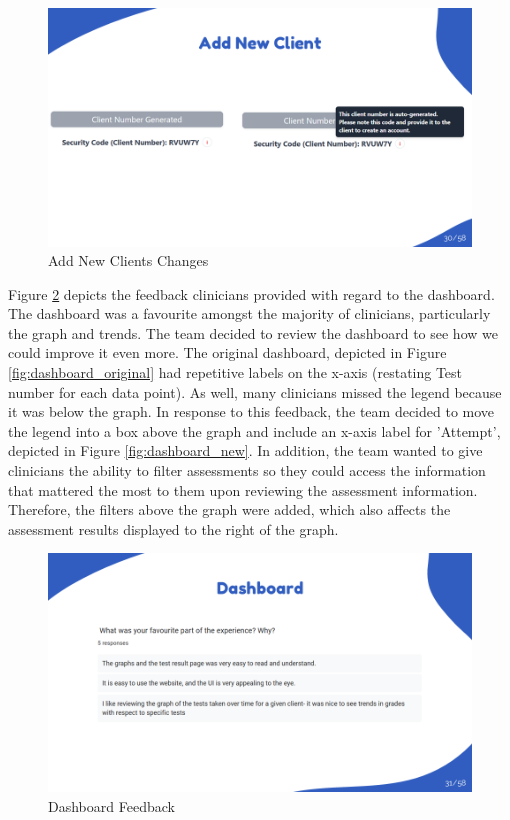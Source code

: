 \documentclass{article}
\begin{document}
\begin{figure}[H]
  \centering
  \includegraphics[width=\textwidth]{images/slide30.png}
  \caption{Add New Clients Changes}
  \label{fig:new_client_changes}
\end{figure}

Figure \ref{fig:dashboard_feedback} depicts the feedback clinicians provided with regard to the dashboard. The dashboard was a favourite amongst the majority of clinicians, particularly the graph and trends.
The team decided to review the dashboard to see how we could improve it even more. The original dashboard, depicted in Figure \ref{fig:dashboard_original} had repetitive labels on the x-axis (restating Test number for each data point).
As well, many clinicians missed the legend because it was below the graph.
In response to this feedback, the team decided to move the legend into a box above the graph and include an x-axis label for 'Attempt', depicted in Figure \ref{fig:dashboard_new}. In addition, the team wanted to give clinicians the ability to filter
assessments so they could access the information that mattered the most to them upon reviewing the assessment information. Therefore, the filters above the graph were added, which also affects the assessment results displayed to the right of the graph.

\begin{figure}[H]
  \centering
  \includegraphics[width=\textwidth]{images/slide31.png}
  \caption{Dashboard Feedback}
  \label{fig:dashboard_feedback}
\end{figure}
\end{document}
